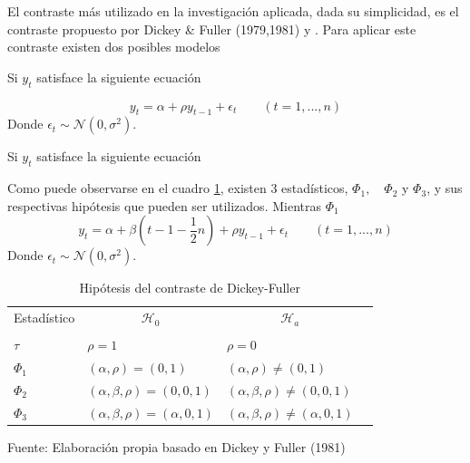 \documentclass[12pt, twoside]{book}\usepackage[]{graphicx}\usepackage[]{color}
\numberwithin{equation}{section}
\numberwithin{theorem}{section}
\numberwithin{teorema}{section}
\numberwithin{defi}{section}
\numberwithin{prop}{section}
\numberwithin{defi}{section}
\theoremstyle{plain}
\begin{document}
El contraste más utilizado en la investigación aplicada, dada su simplicidad, es el contraste propuesto por Dickey \& Fuller (1979,1981) y . Para aplicar este contraste existen dos posibles modelos 

Si $y_{t}$ satisface la siguiente ecuación

\begin{equation}
y_{t} = \alpha+\rho y_{t-1}+\epsilon_{t}\qquad (t=1,...,n)
\end{equation}
Donde $\epsilon_{t}\sim \mathcal{N}(0,\sigma^{2})$. 

Si $y_{t}$ satisface la siguiente ecuación 

Como puede observarse en el cuadro \ref{tab-1}, existen 3 estadísticos, $\Phi_{1},\quad \Phi_{2}$ y $\Phi_{3}$, y sus respectivas hipótesis que pueden ser utilizados. Mientras $\Phi_{1}$
\begin{equation}
y_{t} = \alpha+\beta\left(t-1-\frac{1}{2}n\right)+\rho y_{t-1}+\epsilon_{t}\qquad (t=1,...,n)
\end{equation}
Donde $\epsilon_{t}\sim \mathcal{N}(0,\sigma^{2})$. 

\begin{table}[!htpb]
\centering
\begin{threeparttable}
\caption{Hipótesis del contraste de Dickey-Fuller}
\begin{tabular}{@{}llrllll@{}}
\toprule
\multicolumn{2}{l}{Estadístico} & \multicolumn{2}{c}{$\mathcal{H}_{0}$} &
\multicolumn{2}{c}{$\mathcal{H}_{a}$} \\
\cmidrule(l){3-4} \cmidrule(l){5-6} \\
\multicolumn{2}{l}{$\tau$} & 
\multicolumn{2}{l}{$\rho =1 $} & 
\multicolumn{2}{l}{$\rho =0 $} \\
\multicolumn{2}{l}{$\Phi_{1}$} &
\multicolumn{2}{l}{$(\alpha,\rho)=(0,1)$} &
\multicolumn{2}{l}{$(\alpha,\rho)\neq(0,1)$} \\
\multicolumn{2}{l}{$\Phi_{2}$} &
\multicolumn{2}{l}{$(\alpha,\beta, \rho)=(0,0,1)$} &
\multicolumn{2}{l}{$(\alpha,\beta,\rho)\neq(0,0,1)$} \\
\multicolumn{2}{l}{$\Phi_{3}$} &
\multicolumn{2}{l}{$(\alpha,\beta, \rho)=(\alpha,0,1)$} &
\multicolumn{2}{l}{$(\alpha,\beta,\rho)\neq(\alpha,0,1)$} \\
\bottomrule
\end{tabular}
\label{tab-1}
\begin{tablenotes}
\small
\item Fuente: Elaboración propia basado en Dickey y Fuller (1981)
\end{tablenotes}
\end{threeparttable}
\end{table}
\end{document}
